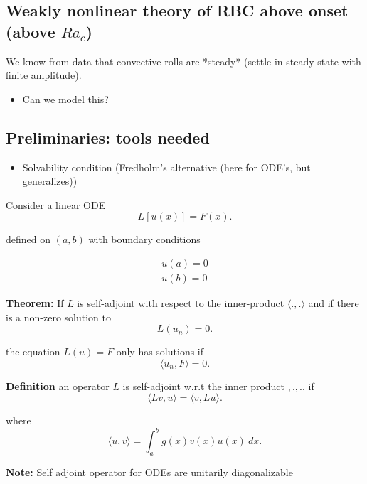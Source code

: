 
\subsectionfont{\fontsize{10}{10}\selectfont}


\subsection{Weakly nonlinear theory of RBC above onset (above $Ra_c$)}%
\label{sub:weakly_nonlinear_theory_of_rbc_above_onset}

We know from data that convective rolls are *steady* (settle in steady state
with finite amplitude).

\begin{itemize}
  \item Can we model this?
\end{itemize}


\subsection{Preliminaries: tools needed}%
\label{sub:preliminaries}

\begin{itemize}
  \item Solvability condition (Fredholm's alternative (here for ODE's, but
    generalizes))
\end{itemize}

Consider a linear ODE
\[
  L [u(x)] = F(x)
.\] 

defined on $ (a,b)$ with boundary conditions

\begin{align*}
  u(a) = 0 \\
  u(b) = 0
\end{align*}

\textbf{Theorem:} If $L$ is self-adjoint with respect to the inner-product
$ \langle .,. \rangle$ and if there is a non-zero solution to
\[
  L(u_{n}) = 0
.\]

the equation $L(u) = F$ only has solutions if
\[
\langle u_{n}, F \rangle = 0
.\] 

\textbf{Definition} an operator $L$ is self-adjoint w.r.t the inner product
$ \left .,.  \right .,.$, if 
\[
\langle Lv,u \rangle = \langle v, Lu \rangle
.\] 

where
\[
  \langle u, v \rangle = \int_{a}^{b} {g(x)v(x)u(x)} \: d{x} 
.\] 

\textbf{Note:} Self adjoint operator for ODEs are unitarily diagonalizable

